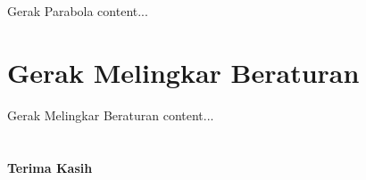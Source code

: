 \documentclass{beamer}
\theoremstyle{plain}
\theoremstyle{plain}
\theoremstyle{definition}
\numberwithin{equation}{section}
\begin{document}
	\begin{frame}{Gerak Parabola}
		content...
	\end{frame}
	
	\section{Gerak Melingkar Beraturan}
	
	\begin{frame}{Gerak Melingkar Beraturan}
		content...
	\end{frame}

	\section{}
	
	\begin{frame}
		
		\begin{center}
			\textbf{\LARGErrr Terima Kasih}
		\end{center}
		
	\end{frame}
	
\end{document}
